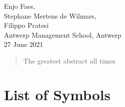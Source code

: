 \documentclass[a4paper, nobind]{templates/ociamthesis}
\begin{document}
\begin{romanpages}
\begin{acknowledgements}
  \begin{flushright}
  Enjo Faes, \\
  Stephane Mertens de Wilmars, \\
  Filippo Pratesi \\
  Antwerp Management School, Antwerp \\
  27 June 2021
  \end{flushright}
\end{acknowledgements}


\begin{abstract}
	The greatest abstract all times
\end{abstract}


\flushbottom

\tableofcontents

\listoffigures
	\mtcaddchapter

\listoftables
  \mtcaddchapter


\end{romanpages}

\flushbottom

\hypertarget{list-of-symbols}{%
\chapter*{List of Symbols}\label{list-of-symbols}}
\end{document}
